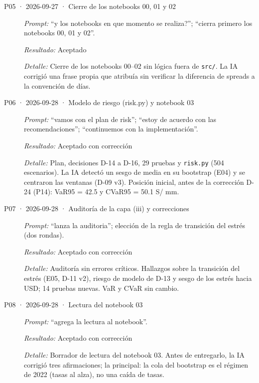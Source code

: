 \begin{description}
\item[P05 · 2026-09-27 · Cierre de los notebooks 00, 01 y 02] \mbox{}\par
\textit{Prompt:} \enquote{y los notebooks en que momento se realiza?}; \enquote{cierra primero los notebooks 00, 01 y 02}.\par
\textit{Resultado:} Aceptado\par
\textit{Detalle:} Cierre de los notebooks 00–02 sin lógica fuera de \texttt{src/}. La IA corrigió una frase propia que atribuía sin verificar la diferencia de spreads a la convención de días.\par
\item[P06 · 2026-09-28 · Modelo de riesgo (risk.py) y notebook 03] \mbox{}\par
\textit{Prompt:} \enquote{vamos con el plan de risk}; \enquote{estoy de acuerdo con las recomendaciones}; \enquote{continuemos con la implementación}.\par
\textit{Resultado:} Aceptado con corrección\par
\textit{Detalle:} Plan, decisiones D-14 a D-16, 29 pruebas y \texttt{risk.py} (504 escenarios). La IA detectó un sesgo de media en su bootstrap (E04) y se centraron las ventanas (D-09 v3). Posición inicial, antes de la corrección D-24 (P14): VaR95 = 42.5 y CVaR95 = 50.1 S/ mm.\par
\item[P07 · 2026-09-28 · Auditoría de la capa (iii) y correcciones] \mbox{}\par
\textit{Prompt:} \enquote{lanza la auditoria}; elección de la regla de transición del estrés (dos rondas).\par
\textit{Resultado:} Aceptado con corrección\par
\textit{Detalle:} Auditoría sin errores críticos. Hallazgos sobre la transición del estrés (E05, D-11 v2), riesgo de modelo de D-13 y sesgo de los estrés hacia USD; 14 pruebas nuevas. VaR y CVaR sin cambio.\par
\item[P08 · 2026-09-28 · Lectura del notebook 03] \mbox{}\par
\textit{Prompt:} \enquote{agrega la lectura al notebook}.\par
\textit{Resultado:} Aceptado con corrección\par
\textit{Detalle:} Borrador de lectura del notebook 03. Antes de entregarlo, la IA corrigió tres afirmaciones; la principal: la cola del bootstrap es el régimen de 2022 (tasas al alza), no una caída de tasas.\par

\end{description}
